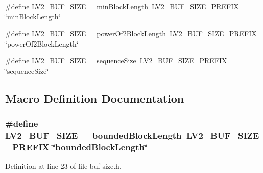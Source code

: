 \begin{DoxyCompactItemize}
\item 
\#define \hyperlink{buf-size_8h_a170e1a5208885aa99adb92bec93631c2}{L\+V2\+\_\+\+B\+U\+F\+\_\+\+S\+I\+Z\+E\+\_\+\+\_\+min\+Block\+Length}~\hyperlink{buf-size_8h_a64096fada3412e9a580cc070d6dfba9b}{L\+V2\+\_\+\+B\+U\+F\+\_\+\+S\+I\+Z\+E\+\_\+\+P\+R\+E\+F\+IX} \char`\"{}min\+Block\+Length\char`\"{}
\item 
\#define \hyperlink{buf-size_8h_a36af838253d6c209820acabc1d4ee4a3}{L\+V2\+\_\+\+B\+U\+F\+\_\+\+S\+I\+Z\+E\+\_\+\+\_\+power\+Of2\+Block\+Length}~\hyperlink{buf-size_8h_a64096fada3412e9a580cc070d6dfba9b}{L\+V2\+\_\+\+B\+U\+F\+\_\+\+S\+I\+Z\+E\+\_\+\+P\+R\+E\+F\+IX} \char`\"{}power\+Of2\+Block\+Length\char`\"{}
\item 
\#define \hyperlink{buf-size_8h_a4f7c57fcf4c65f80726dceaf0375f890}{L\+V2\+\_\+\+B\+U\+F\+\_\+\+S\+I\+Z\+E\+\_\+\+\_\+sequence\+Size}~\hyperlink{buf-size_8h_a64096fada3412e9a580cc070d6dfba9b}{L\+V2\+\_\+\+B\+U\+F\+\_\+\+S\+I\+Z\+E\+\_\+\+P\+R\+E\+F\+IX} \char`\"{}sequence\+Size\char`\"{}
\end{DoxyCompactItemize}


\subsection{Macro Definition Documentation}
\subsubsection[{\texorpdfstring{L\+V2\+\_\+\+B\+U\+F\+\_\+\+S\+I\+Z\+E\+\_\+\+\_\+bounded\+Block\+Length}{LV2_BUF_SIZE__boundedBlockLength}}]{\setlength{\rightskip}{0pt plus 5cm}\#define L\+V2\+\_\+\+B\+U\+F\+\_\+\+S\+I\+Z\+E\+\_\+\+\_\+bounded\+Block\+Length~{\bf L\+V2\+\_\+\+B\+U\+F\+\_\+\+S\+I\+Z\+E\+\_\+\+P\+R\+E\+F\+IX} \char`\"{}bounded\+Block\+Length\char`\"{}}\hypertarget{buf-size_8h_ae6b296269312d108c3b1bc15ed03942c}{}\label{buf-size_8h_ae6b296269312d108c3b1bc15ed03942c}


Definition at line 23 of file buf-\/size.\+h.

